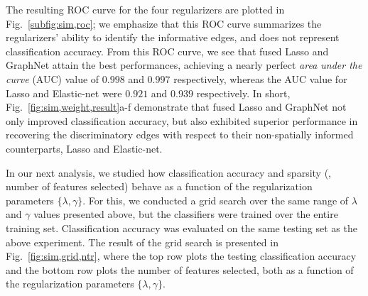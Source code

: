 The resulting ROC curve for the four regularizers are plotted in Fig.~\ref{subfig:sim,roc}; we emphasize that this ROC curve summarizes the regularizers' ability to identify the informative edges, and does not represent classification accuracy.
From this ROC curve, we see that fused Lasso and GraphNet attain the best performances, achieving a nearly perfect \emph{area under the curve} (AUC) value of $0.998$ and $0.997$ respectively, whereas the AUC value for Lasso and Elastic-net were $0.921$ and $0.939$ respectively.
In short, Fig.~\ref{fig:sim,weight,result}a-f demonstrate that fused Lasso and GraphNet not only improved classification accuracy, but also exhibited superior performance in recovering the discriminatory edges with respect to their non-spatially informed counterparts, Lasso and Elastic-net.

In our next analysis, we studied how classification accuracy and sparsity (\ie, number of features selected) behave as a function of the regularization parameters $\{\lambda,\gamma\}$.
For this, we conducted a grid search over the same range of $\lambda$ and $\gamma$ values presented above, but the classifiers were trained over the entire training set.
Classification accuracy was evaluated on the same testing set as the above experiment.
The result of the grid search is presented in Fig.~\ref{fig:sim,grid,ntr}, where the top row plots the testing classification accuracy and the bottom row plots the number of features selected, both as a function of the regularization parameters $\{\lambda,\gamma\}$.

